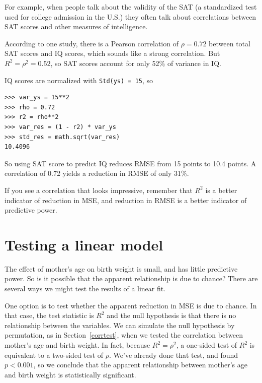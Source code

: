 \documentclass[12pt]{book}
\begin{document}
For example, when people talk about the validity of the SAT
(a standardized test used for college admission in the U.S.) they
often talk about correlations between SAT scores and other measures of
intelligence.

According to one study, there is a Pearson correlation of
$\rho=0.72$ between total SAT scores and IQ scores, which sounds like
a strong correlation.  But $R^2 = \rho^2 = 0.52$, so SAT scores
account for only 52\% of variance in IQ.

IQ scores are normalized with \verb"Std(ys) = 15", so

\begin{verbatim}
>>> var_ys = 15**2
>>> rho = 0.72
>>> r2 = rho**2
>>> var_res = (1 - r2) * var_ys
>>> std_res = math.sqrt(var_res)
10.4096
\end{verbatim}

So using SAT score to predict IQ reduces RMSE from 15 points to 10.4
points.  A correlation of 0.72 yields a reduction in RMSE of only
31\%.

If you see a correlation that looks impressive, remember that $R^2$ is
a better indicator of reduction in MSE, and reduction in RMSE is a
better indicator of predictive power.


\section{Testing a linear model}

The effect of mother's age on birth weight is small, and has little
predictive power.  So is it possible that the apparent relationship
is due to chance?  There are several ways we might test the
results of a linear fit.

One option is to test whether the apparent reduction in MSE is due to
chance.  In that case, the test statistic is $R^2$ and the null
hypothesis is that there is no relationship between the variables.  We
can simulate the null hypothesis by permutation, as in
Section~\ref{corrtest}, when we tested the correlation between
mother's age and birth weight.  In fact, because $R^2 = \rho^2$, a
one-sided test of $R^2$ is equivalent to a two-sided test of $\rho$.
We've already done that test, and found $p < 0.001$, so we conclude
that the apparent relationship between mother's age and birth weight
is statistically significant.
   
\end{document}
